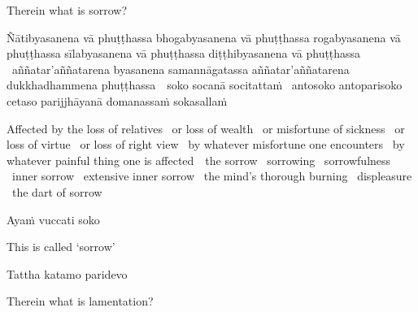 \begin{english}
  Therein what is sorrow?
\end{english}

\begin{pali-hang}
  Ñātibyasanena vā phuṭṭhassa bhogabyasanena vā phuṭṭhassa rogabyasanena vā phuṭṭhassa sīlabyasanena vā phuṭṭhassa diṭṭhibyasanena vā phuṭṭhassa \breathmark\ aññatar'aññatarena byasanena samannāgatassa aññatar'aññatarena dukkhadhammena \mbox{phuṭṭhassa}~\breathmark\ soko socanā socitattaṁ \breathmark\ antosoko antoparisoko cetaso parijjhāyanā domanassaṁ sokasallaṁ
\end{pali-hang}

\begin{english-hang-verses}
  Affected by the loss of relatives \breathmark\ or loss of wealth \breathmark\ or misfortune of sickness \breathmark\ or loss of virtue \breathmark\ or loss of right view\makeatletter\hyperlink{endnote84-appendix}\makeatother
  \breathmark\ by whatever misfortune one encounters \breathmark\ by whatever painful thing one is \mbox{affected}~\breathmark\ the sorrow \breathmark\ sorrowing \breathmark\ sorrowfulness \breathmark\ inner sorrow \breathmark\ extensive inner sorrow \breathmark\ the mind's thorough burning \breathmark\ displeasure \breathmark\ the dart of sorrow
\end{english-hang-verses}

Ayaṁ vuccati soko

\begin{english}
  This is called `sorrow'
\end{english}

Tattha katamo paridevo

\begin{english}
  Therein what is lamentation?
\end{english}

